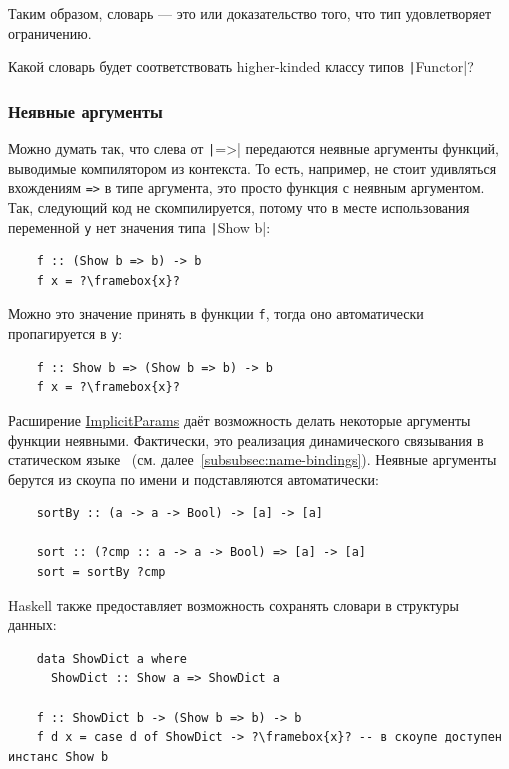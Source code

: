 Таким образом, словарь --- это  или доказательство того, что тип удовлетворяет ограничению.

\begin{task}
    Какой словарь будет соответствовать higher-kinded классу типов \texttt|Functor|?
\end{task}

\subsubsection{Неявные аргументы} \label{subsubsec:ad-hoc-implicits}

Можно думать так, что слева от \texttt|=>| передаются неявные аргументы функций, выводимые компилятором из контекста.
То есть, например, не стоит удивляться вхождениям \texttt{=>} в типе аргумента, это просто функция с неявным аргументом.
Так, следующий код не скомпилируется, потому что в месте использования переменной \texttt{y} нет значения типа \texttt|Show b|:
\begin{verbatim}
    f :: (Show b => b) -> b
    f x = ?\framebox{x}?
\end{verbatim}
Можно это значение принять в функции \texttt{f}, тогда оно автоматически пропагируется в \texttt{y}:
\begin{verbatim}
    f :: Show b => (Show b => b) -> b
    f x = ?\framebox{x}?
\end{verbatim}

Расширение \href{https://ghc.gitlab.haskell.org/ghc/doc/users_guide/exts/implicit_parameters.html}{ImplicitParams} даёт возможность делать некоторые аргументы функции неявными.
Фактически, это реализация динамического связывания в статическом языке~\cite{lewis2000implicit} (см. далее\ \ref{subsubsec:name-bindings}).
Неявные аргументы берутся из скоупа по имени и подставляются автоматически:
\begin{verbatim}
    sortBy :: (a -> a -> Bool) -> [a] -> [a]

    sort :: (?cmp :: a -> a -> Bool) => [a] -> [a]
    sort = sortBy ?cmp
\end{verbatim}

Haskell также предоставляет возможность сохранять словари в структуры данных:
\begin{verbatim}
    data ShowDict a where
      ShowDict :: Show a => ShowDict a

    f :: ShowDict b -> (Show b => b) -> b
    f d x = case d of ShowDict -> ?\framebox{x}? -- в скоупе доступен инстанс Show b
\end{verbatim}

